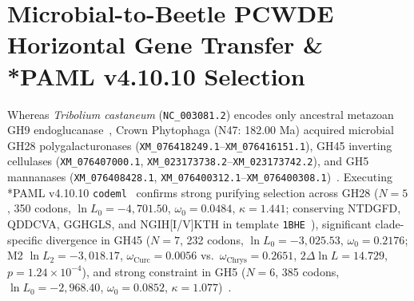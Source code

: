 \documentclass[10pt,letterpaper]{article}
\begin{document}
\section{Microbial-to-Beetle PCWDE Horizontal Gene Transfer \& *PAML v4.10.10 Selection}
Whereas \textit{Tribolium castaneum} (\texttt{NC\_003081.2}) encodes only ancestral metazoan GH9 endoglucanase~\cite{Tribolium2008}, Crown Phytophaga (N47: 182.00 Ma) acquired microbial GH28 polygalacturonases (\texttt{XM\_076418249.1}--\texttt{XM\_076416151.1}), GH45 inverting cellulases (\texttt{XM\_076407000.1}, \texttt{XM\_023173738.2}--\texttt{XM\_023173742.2}), and GH5 mannanases (\texttt{XM\_076408428.1}, \texttt{XM\_076400312.1}--\texttt{XM\_076400308.1})~\cite{Kirsch2014,Pauchet2010,McKenna2016,Acuna2012,Schoville2018,Keeling2013,Parisot2021,Hazzouri2020}. Executing *PAML v4.10.10 \texttt{codeml}~\cite{Yang2005} confirms strong purifying selection across GH28 ($N = 5$, 350 codons, $\ln L_0 = -4,701.50$, $\omega_0 = 0.0484$, $\kappa = 1.441$; conserving NTDGFD, QDDCVA, GGHGLS, and NGIH[I/V]KTH in template \texttt{1BHE}~\cite{vanSanten1999,Zhang2022USalign}), significant clade-specific divergence in GH45 ($N = 7$, 232 codons, $\ln L_0 = -3,025.53$, $\omega_0 = 0.2176$; M2 $\ln L_2 = -3,018.17$, $\omega_{\text{Curc}} = 0.0056$ vs.\ $\omega_{\text{Chrys}} = 0.2651$, $2\Delta\ln L = 14.729$, $p = 1.24 \times 10^{-4}$), and strong constraint in GH5 ($N = 6$, 385 codons, $\ln L_0 = -2,968.40$, $\omega_0 = 0.0852$, $\kappa = 1.077$)~\cite{Kirsch2016,Morcos2011}.
\end{document}
